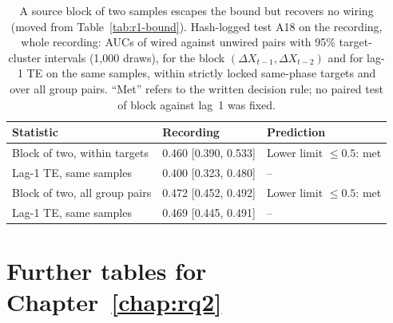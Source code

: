 \begin{table}[tbp]
  \centering
  \small
  \caption[A source block of two samples on the recording]{A source block of two samples escapes the bound but recovers no wiring (moved from Table~\ref{tab:r1-bound}). Hash-logged test A18 on the recording, whole recording: AUCs of wired against unwired pairs with 95\% target-cluster intervals (1,000 draws), for the block $(\Delta X_{t-1}, \Delta X_{t-2})$ and for lag-1 TE on the same samples, within strictly locked same-phase targets and over all group pairs. ``Met'' refers to the written decision rule; no paired test of block against lag~1 was fixed.}
  \label{tab:app-r1-a18}
  \begin{tabular}{@{}lll@{}}
    \toprule
    Statistic & Recording & Prediction \\
    \midrule
    Block of two, within targets & 0.460 [0.390, 0.533] & Lower limit $\le 0.5$: met \\
    Lag-1 TE, same samples & 0.400 [0.323, 0.480] & -- \\
    Block of two, all group pairs & 0.472 [0.452, 0.492] & Lower limit $\le 0.5$: met \\
    Lag-1 TE, same samples & 0.469 [0.445, 0.491] & -- \\
    \bottomrule
  \end{tabular}
\end{table}

\section{Further tables for Chapter~\ref{chap:rq2}}

